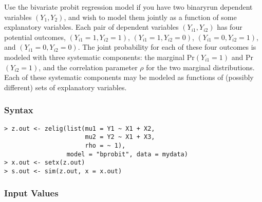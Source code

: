 \documentclass{article}
\begin{document}
Use the bivariate probit regression model if you have two binaryrun
dependent variables $(Y_1, Y_2)$, and wish to model them jointly as a
function of some explanatory variables.  Each pair of dependent
variables $(Y_{i1}, Y_{i2})$ has four potential outcomes, $(Y_{i1}=1,
Y_{i2}=1)$, $(Y_{i1}=1, Y_{i2}=0)$, $(Y_{i1}=0, Y_{i2}=1)$, and
$(Y_{i1}=0, Y_{i2}=0)$.  The joint probability for each of these four
outcomes is modeled with three systematic components: the marginal
Pr$(Y_{i1} = 1)$ and Pr$(Y_{i2} = 1)$, and the correlation parameter
$\rho$ for the two marginal distributions.  Each of these systematic
components may be modeled as functions of (possibly different) sets of
explanatory variables.

\subsubsection{Syntax}

\begin{verbatim}
> z.out <- zelig(list(mu1 = Y1 ~ X1 + X2, 
                      mu2 = Y2 ~ X1 + X3,
                      rho = ~ 1),
                 model = "bprobit", data = mydata)
> x.out <- setx(z.out)
> s.out <- sim(z.out, x = x.out)
\end{verbatim}

\subsubsection{Input Values}
\end{document}
